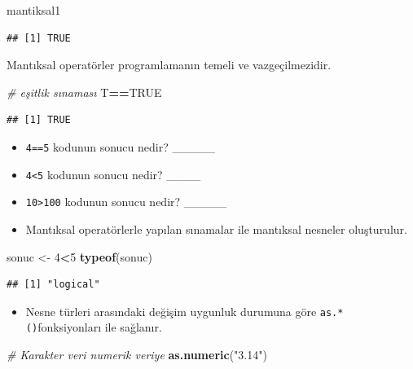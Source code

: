 \documentclass[
  oneside]{book}
\newenvironment{Shaded}{\begin{snugshade}}{\end{snugshade}}
\newcommand{\CommentTok}[1]{\textcolor[rgb]{0.56,0.35,0.01}{\textit{#1}}}
\newcommand{\ConstantTok}[1]{\textcolor[rgb]{0.56,0.35,0.01}{#1}}
\newcommand{\DecValTok}[1]{\textcolor[rgb]{0.00,0.00,0.81}{#1}}
\newcommand{\FunctionTok}[1]{\textcolor[rgb]{0.13,0.29,0.53}{\textbf{#1}}}
\newcommand{\NormalTok}[1]{#1}
\newcommand{\OtherTok}[1]{\textcolor[rgb]{0.56,0.35,0.01}{#1}}
\newcommand{\SpecialCharTok}[1]{\textcolor[rgb]{0.81,0.36,0.00}{\textbf{#1}}}
\newcommand{\StringTok}[1]{\textcolor[rgb]{0.31,0.60,0.02}{#1}}
\providecommand{\tightlist}{%
  \setlength{\itemsep}{0pt}\setlength{\parskip}{0pt}}
\begin{document}
\begin{Shaded}
\begin{Highlighting}[]
\NormalTok{mantiksal1}
\end{Highlighting}
\end{Shaded}

\begin{verbatim}
## [1] TRUE
\end{verbatim}

Mantıksal operatörler programlamanın temeli ve vazgeçilmezidir.

\begin{Shaded}
\begin{Highlighting}[]
\CommentTok{\# eşitlik sınaması}
\NormalTok{T}\SpecialCharTok{==}\ConstantTok{TRUE}
\end{Highlighting}
\end{Shaded}

\begin{verbatim}
## [1] TRUE
\end{verbatim}

\begin{itemize}
\item
  \texttt{4==5} kodunun sonucu nedir? \_\_\_\_\_
\item
  \texttt{4\textless{}5} kodunun sonucu nedir? \_\_\_\_
\item
  \texttt{10\textgreater{}100} kodunun sonucu nedir? \_\_\_\_\_
\item
  Mantıksal operatörlerle yapılan sınamalar ile mantıksal nesneler oluşturulur.
\end{itemize}

\begin{Shaded}
\begin{Highlighting}[]
\NormalTok{sonuc }\OtherTok{\textless{}{-}} \DecValTok{4}\SpecialCharTok{\textless{}}\DecValTok{5}
\FunctionTok{typeof}\NormalTok{(sonuc)}
\end{Highlighting}
\end{Shaded}

\begin{verbatim}
## [1] "logical"
\end{verbatim}

\begin{itemize}
\tightlist
\item
  Nesne türleri arasındaki değişim uygunluk durumuna göre \texttt{as.*()}fonksiyonları ile sağlanır.
\end{itemize}

\begin{Shaded}
\begin{Highlighting}[]
\CommentTok{\# Karakter veri numerik veriye}
\FunctionTok{as.numeric}\NormalTok{(}\StringTok{"3.14"}\NormalTok{)}
\end{Highlighting}
\end{Shaded}
\end{document}

